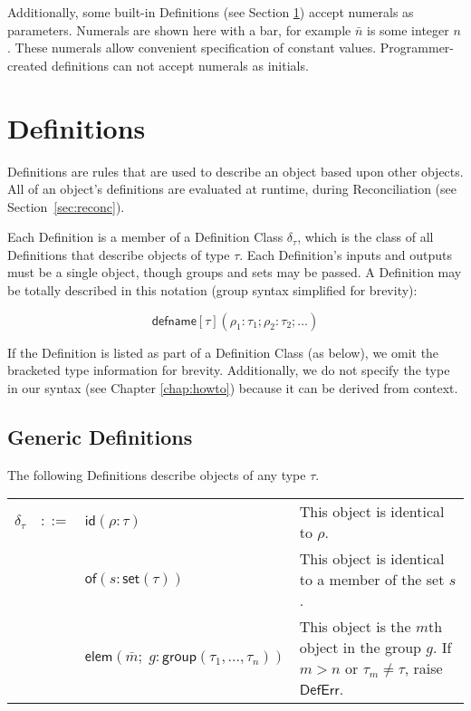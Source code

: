 \documentclass[11pt]{report}
\begin{document}
Additionally, some built-in Definitions (see Section \ref{sec:def}) accept numerals as parameters. 
Numerals are shown here with a bar, for example $\bar{n}$ is some integer $n$.
These numerals allow convenient specification of constant values. 
Programmer-created definitions can not accept numerals as initials. 

\section{Definitions}
\label{sec:def}

Definitions are rules that are used to describe an object based upon other objects. All of an object's definitions are evaluated at runtime, during Reconciliation (see Section~\ref{sec:reconc}). 

Each Definition is a member of a Definition Class $\delta_\tau$, which is the class of all Definitions that describe objects of type $\tau$. 
Each Definition's inputs and outputs must be a single object, though groups and sets may be passed.
A Definition may be totally described in this notation (group syntax simplified for brevity): 

$$\mathsf{defname}[\tau](\rho_1 : \tau_1; \rho_2 : \tau_2; \dots)$$

If the Definition is listed as part of a Definition Class (as below), we omit the bracketed type information for brevity. Additionally, we do not specify the type in our syntax (see Chapter \ref{chap:howto}) because it can be derived from context.

\subsection{Generic Definitions}
\label{subsec:def-gen}

The following Definitions describe objects of any type $\tau$. \\

\noindent \begin{tabularx}{\textwidth}{l l l X}
$\delta_{\tau}$ & $::=$ & $\mathsf{id}(\rho : \tau)$ & This object is identical to $\rho$. \\
 & & $\mathsf{of}(s : \mathsf{set}(\mathsf{\tau}))$ & This object is identical to a member of the set $s$. \\
 & & $\mathsf{elem}(\bar{m}; \; g : \mathsf{group}(\tau_1, \dots, \tau_n))$ & This object is the $m$th object in the group $g$. If $m > n$ or $\tau_m \neq \tau$, raise $\mathsf{DefErr}$.
\end{tabularx}
\end{document}
